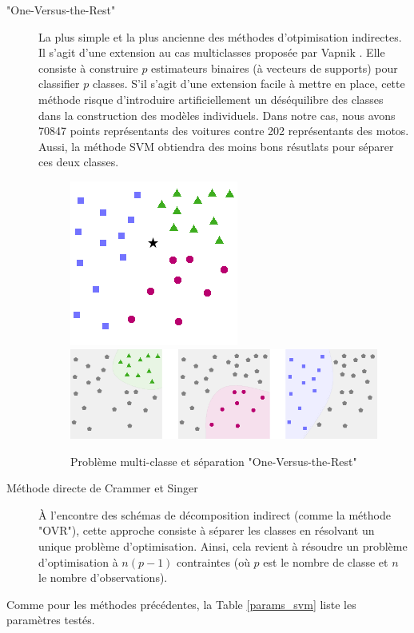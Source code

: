 \documentclass[a4paper]{report}
\begin{document}
\begin{description}
\item["One-Versus-the-Rest"] La plus simple et la plus ancienne des méthodes d'otpimisation indirectes. Il s'agit d'une extension au cas multiclasses proposée par Vapnik \cite{Vapnik}. Elle consiste à construire $p$ estimateurs binaires (à vecteurs de supports) pour classifier $p$ classes. S'il s'agit d'une extension facile à mettre en place, cette méthode risque d'introduire artificiellement un déséquilibre des classes dans la construction des modèles individuels. Dans notre cas, nous avons 70847 points représentants des voitures contre 202 représentants des motos. Aussi, la méthode SVM obtiendra des moins bons résutlats pour séparer ces deux classes.

\begin{figure}
\centering
\includegraphics[scale=0.6]{img/svm.png}
\includegraphics[scale=0.6]{img/svm_OneVsAll.png}
\caption{Problème multi-classe et séparation "One-Versus-the-Rest"}
\end{figure}

\item[Méthode directe de Crammer et Singer \cite{Crammer}] À l'encontre des schémas de décomposition indirect (comme la méthode "OVR"), cette approche cons\-iste à séparer les classes en résolvant un unique problème d'optimisation. Ainsi, cela revient à résoudre un problème d'optimisation à $n(p-1)$ contraintes (où $p$ est le nombre de classe et $n$ le nombre d'observations).
\end{description}
Comme pour les méthodes précédentes, la Table \ref{params_svm} liste les paramètres testés.
\end{document}
